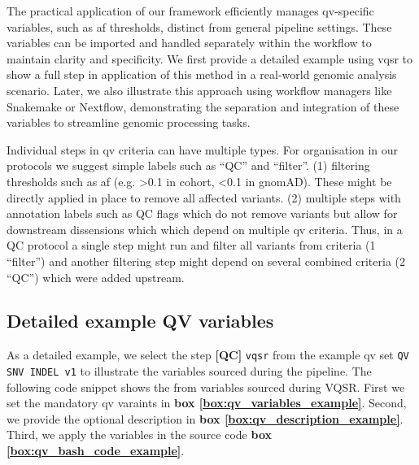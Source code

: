 The practical application of our framework efficiently manages \ac{qv}-specific variables, such as \ac{af} thresholds, distinct from general pipeline settings. These variables can be imported and handled separately within the workflow to maintain clarity and specificity.  
We first provide a detailed example using \ac{vqsr} to show a full step in application of this method in a real-world genomic analysis scenario.
Later, we also illustrate this approach using workflow managers like Snakemake or Nextflow, demonstrating the separation and integration of these variables to streamline genomic processing tasks.


Individual steps in \ac{qv} criteria can have multiple types. 
For organisation in our protocols we suggest simple labels such as ``QC'' and ``filter''. 
(1) filtering thresholds such as \ac{af} (e.g. >0.1 in cohort, <0.1 in gnomAD). These might be directly applied in place to remove all affected variants. 
(2) multiple steps with annotation labels such as QC flags which do not remove variants but allow for downstream dissensions which which depend on multiple \ac{qv} criteria. 
Thus, in a QC protocol a single step might run and filter all variants from criteria (1 ``filter'') and another filtering step might depend on several combined criteria (2 ``QC'') which were added upstream.

\subsection{Detailed example QV variables}\label{sec:protocol_variables_example}
As a detailed example, we select the step \textbf{[QC]} \colorbox{kispiblue!30}{\texttt{vqsr}} from the example \ac{qv} set
\colorbox{colorSUNSET2!60}{\texttt{QV SNV INDEL v1}}
to illustrate the variables sourced during the pipeline.
The following code snippet shows the from variables sourced during VQSR. 
First we set the mandatory \ac{qv} varaints in 
\textbf{box \ref{box:qv_variables_example}}.
Second, we provide the optional description in 
\textbf{box \ref{box:qv_description_example}}.
Third, we apply the variables in the source code 
\textbf{box \ref{box:qv_bash_code_example}}. 


